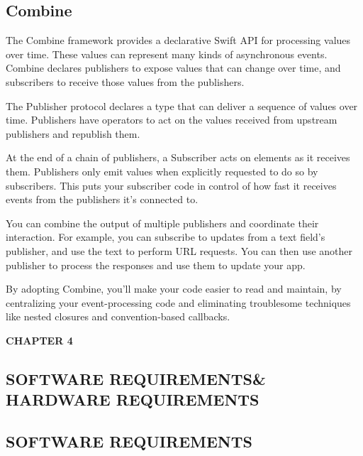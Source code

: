 \documentclass[12pt]{article}
\begin{document}
\subsection{Combine}


The Combine framework provides a declarative Swift API for processing values over time. These values can represent many kinds of asynchronous events. Combine declares publishers to expose values that can change over time, and subscribers to receive those values from the publishers.\par
The Publisher protocol declares a type that can deliver a sequence of values over time. Publishers have operators to act on the values received from upstream publishers and republish them.

At the end of a chain of publishers, a Subscriber acts on elements as it receives them. Publishers only emit values when explicitly requested to do so by subscribers. This puts your subscriber code in control of how fast it receives events from the publishers it’s connected to.

You can combine the output of multiple publishers and coordinate their interaction. For example, you can subscribe to updates from a text field’s publisher, and use the text to perform URL requests. You can then use another publisher to process the responses and use them to update your app.

By adopting Combine, you’ll make your code easier to read and maintain, by centralizing your event-processing code and eliminating troublesome techniques like nested closures and convention-based callbacks.






\newpage
\begin{flushleft}\textbf{CHAPTER 4} \end{flushleft}
\begin{flushleft}\section{SOFTWARE REQUIREMENTS\&
HARDWARE REQUIREMENTS} \end{flushleft}
\vspace*{10px}
\subsection{SOFTWARE REQUIREMENTS}
\end{document}
